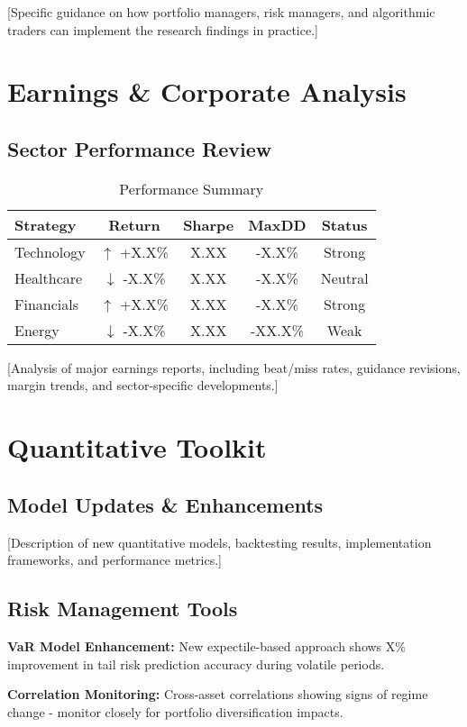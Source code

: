 \documentclass[11pt,a4paper]{article}
\makeatletter
\newcommand{\up}[1]{\textcolor{successgreen}{$\uparrow$ #1}}
\newcommand{\down}[1]{\textcolor{dangerred}{$\downarrow$ #1}}
\newenvironment{perftable}[1][Performance Summary]{%
    \begin{table}[h]
    \centering
    \caption{#1}
    \footnotesize
    \renewcommand{\arraystretch}{1.3}
    \begin{tabular}{@{}lcccc@{}}
    \toprule
    \rowcolor{primaryblue!10}
    \textbf{Strategy} & \textbf{Return} & \textbf{Sharpe} & \textbf{MaxDD} & \textbf{Status} \\
    \midrule
}{%
    \bottomrule
    \end{tabular}
    \end{table}
}
\makeatother
\begin{document}
[Specific guidance on how portfolio managers, risk managers, and algorithmic traders can implement the research findings in practice.]

\section{Earnings \& Corporate Analysis}

\subsection{Sector Performance Review}

\begin{perftable}
Technology & \up{+X.X\%} & X.XX & -X.X\% & \textcolor{successgreen}{Strong} \\
\rowcolor{tablealternate}
Healthcare & \down{-X.X\%} & X.XX & -X.X\% & \textcolor{warningorange}{Neutral} \\
Financials & \up{+X.X\%} & X.XX & -X.X\% & \textcolor{successgreen}{Strong} \\
\rowcolor{tablealternate}
Energy & \down{-X.X\%} & X.XX & -XX.X\% & \textcolor{dangerred}{Weak} \\
\end{perftable}

[Analysis of major earnings reports, including beat/miss rates, guidance revisions, margin trends, and sector-specific developments.]

\section{Quantitative Toolkit}

\subsection{Model Updates \& Enhancements}

[Description of new quantitative models, backtesting results, implementation frameworks, and performance metrics.]

\subsection{Risk Management Tools}

\begin{riskbox}
\textbf{VaR Model Enhancement:} New expectile-based approach shows X\% improvement in tail risk prediction accuracy during volatile periods.

\textbf{Correlation Monitoring:} Cross-asset correlations showing signs of regime change - monitor closely for portfolio diversification impacts.
\end{riskbox}
\end{document}

